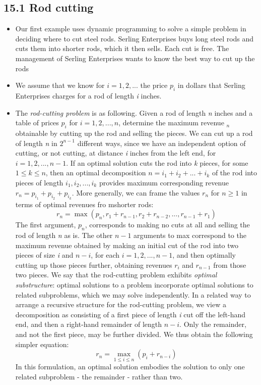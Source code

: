 \documentclass{report}
\begin{document}
\subsection*{15.1 Rod cutting}
\begin{itemize}
    \item Our first example uses dynamic programming to solve a simple problem in deciding where to cut steel rods. Serling Enterprises buys long steel rods and cuts them into shorter rods, which it then sells. Each cut is free. The management of Serling Enterprises wants to know the best way to cut up the rods
    \item We assume that we know for $i = 1, 2, ...$ the price $p_i$ in dollars that Serling Enterprises charges for a rod of length \textit{i} inches.
    \item The \textit{rod-cutting problem} is as following. Given a rod of length \textit{n} inches and a table of prices $p_i$ for $i = 1, 2, ..., n$, determine the maximum revenue $_n$ obtainable by cutting up the rod and selling the pieces. We can cut up a rod of length \textit{n} in $2^{n - 1}$ different ways, since we have an independent option of cutting, or not cutting, at distance \textit{i} inches from the left end, for $i = 1, 2, ..., n - 1$. If an optimal solution cuts the rod into \textit{k} pieces, for some $1 \leq k \leq n$, then an optimal decomposition $n = i_1 + i_2 + ... + i_k$ of the rod into pieces of length $i_1, i_2, ..., i_k$ provides maximum corresponding revenue $r_n = p_{i_1} + p_{i_2} + p_{i_k}$. 
    More generally, we can frame the values $r_n$ for $n \geq 1$ in terms of optimal revenues fro mshorter rods: 
    $$r_n = \max(p_n, r_1 + r_{n - 1}, r_2 + r_{n - 2}, ..., r_{n - 1} + r_1)$$
    The first argument, $p_n$, corresponds to making no cuts at all and selling the rod of length \textit{n} as is. The other $n - 1$ arguments to max correspond to the maximum revenue obtained by making an initial cut of the rod into two pieces of size \textit{i} and $n - i$, for each $i = 1, 2, ..., n - 1$, and then optimally cutting up those pieces further, obtaining revenues $r_i$ and $r_{n - 1}$ from those two pieces.
    We say that the rod-cutting problem exhibits \textit{optimal substructure}: optimal solutions to a problem incorporate optimal solutions to related subproblems, which we may solve independently.
    In a related way to arrange a recursive structure for the rod-cutting problem, we view a decomposition as consisting of a first piece of length \textit{i} cut off the left-hand end, and then a right-hand remainder of length $n - i$. Only the remainder, and not the first piece, may be further divided. We thus obtain the following simpler equation:
    $$r_n = \max_{1 \leq i \leq n} (p_i + r_{n - i})$$
    In this formulation, an optimal solution embodies the solution to only one related subproblem - the remainder - rather than two.
\end{itemize}
\end{document}

